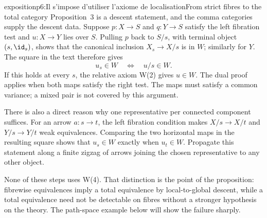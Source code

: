 \begin{dcomment}{exposition}{p6:Il s'impose d'utiliser l'axiome de localisation}{From strict fibres to the total category}
Proposition~3 is a descent statement, and the comma categories supply the descent data. Suppose \(p:X\to S\) and \(q:Y\to S\) satisfy the left fibration test and \(u:X\to Y\) lies over \(S\). Pulling \(p\) back to \(S/s\), with terminal object \((s,\id_s)\), shows that the canonical inclusion \(X_s\to X/s\) is in \(W\); similarly for \(Y\). The square in the text therefore gives
\[
 u_s\in W\quad\Longleftrightarrow\quad u/s\in W .
\]
If this holds at every \(s\), the relative axiom W(2) gives \(u\in W\). The dual proof applies when both maps satisfy the right test. The maps must satisfy a common variance; a mixed pair is not covered by this argument.

There is also a direct reason why one representative per connected component suffices. For an arrow \(a:s\to t\), the left fibration condition makes \(X/s\to X/t\) and \(Y/s\to Y/t\) weak equivalences. Comparing the two horizontal maps in the resulting square shows that \(u_s\in W\) exactly when \(u_t\in W\). Propagate this statement along a finite zigzag of arrows joining the chosen representative to any other object.

None of these steps uses W(4). That distinction is the point of the proposition: fibrewise equivalences imply a total equivalence by local-to-global descent, while a total equivalence need not be detectable on fibres without a stronger hypothesis on the theory. The path-space example below will show the failure sharply.
\end{dcomment}

